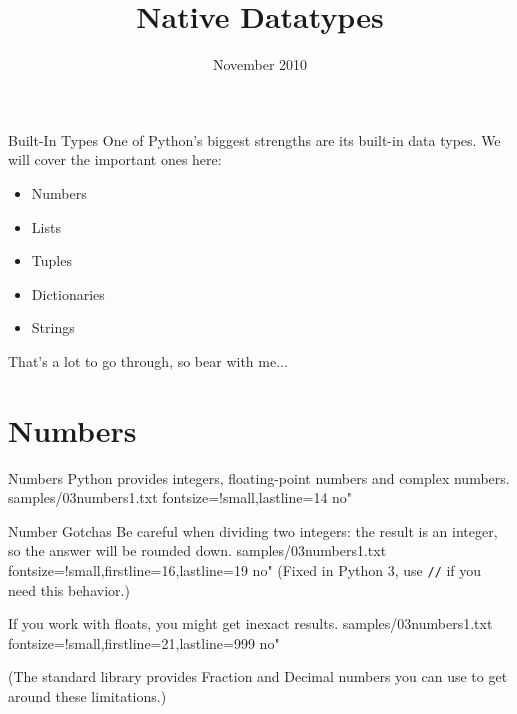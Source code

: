 \documentclass{pyslides}
\title{Native Datatypes}
\date{November 2010}
\begin{document}
\begin{frame}\titlepage\end{frame}

\section{}

\begin{frame}[fragile]{Built-In Types}
One of Python's biggest strengths are its built-in data types. We will cover the important ones here:
\begin{itemize}
\item Numbers
\item Lists
\item Tuples
\item Dictionaries
\item Strings
\end{itemize}

\bigskip

That's a lot to go through, so bear with me...

\end{frame}

\section{Numbers}

\begin{frame}[fragile]{Numbers}
Python provides integers, floating-point numbers and complex numbers.
 samples/03numbers1.txt fontsize=!small,lastline=14 no"
\end{frame}

\begin{frame}[fragile]{Number Gotchas}
Be careful when dividing two integers: the result is an integer, so the answer will be rounded down.
 samples/03numbers1.txt fontsize=!small,firstline=16,lastline=19 no"
(Fixed in Python 3, use \verb+//+ if you need this behavior.)

\bigskip

If you work with floats, you might get inexact results.
 samples/03numbers1.txt fontsize=!small,firstline=21,lastline=999 no"

\bigskip

{\small (The standard library provides Fraction and Decimal numbers you can use to get around these limitations.)}
\end{frame}
\end{document}
